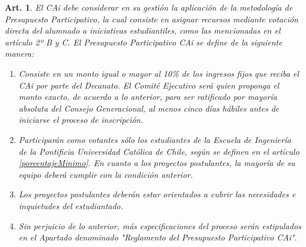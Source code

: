 \documentclass[letterpaper,11pt]{article}
\theoremstyle{plain}
\newtheorem{art}{Art.} %
\begin{document}
			\begin{art}\label{definicionPParticipativo1}
				El CAi debe considerar en su gestión la aplicación de la metodología de Presupuesto Participativo, la cual consiste en asignar recursos mediante votación directa del alumnado a iniciativas estudiantiles, como las mencionadas en el artículo 2º B y C. El Presupuesto Participativo CAi se define de la siguiente manera:
				\begin{enumerate}
					\item Consiste en un monto igual o mayor al 10\% de los ingresos fijos que reciba el CAi por parte del Decanato. El Comité Ejecutivo será quien proponga el monto exacto, de acuerdo a lo anterior, para ser ratificado por mayoría absoluta del Consejo Generacional, al menos cinco días hábiles antes de iniciarse el proceso de inscripción.
					\item Participarán como votantes sólo los estudiantes de la Escuela de Ingeniería de la Pontificia Universidad Católica de Chile, según se definen en el artículo \ref{porcentajeMinimo}. En cuanto a los proyectos postulantes, la mayoría de su equipo deberá cumplir con la condición anterior.
					\item Los proyectos postulantes deberán estar orientados a cubrir las necesidades e inquietudes del estudiantado.
					\item Sin perjuicio de lo anterior, más especificaciones del proceso serán estipulados en el Apartado denominado \textit{"Reglamento del Presupuesto Participativo CAi"}.
				\end{enumerate}
			\end{art}
\end{document}
